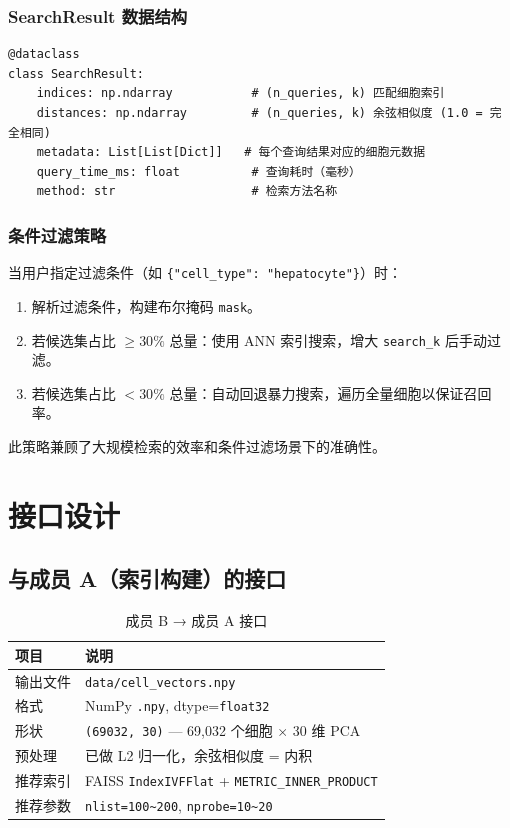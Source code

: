 \documentclass[12pt,a4paper]{ctexart}
\begin{document}
\subsubsection{SearchResult 数据结构}

\begin{lstlisting}
@dataclass
class SearchResult:
    indices: np.ndarray           # (n_queries, k) 匹配细胞索引
    distances: np.ndarray         # (n_queries, k) 余弦相似度 (1.0 = 完全相同)
    metadata: List[List[Dict]]   # 每个查询结果对应的细胞元数据
    query_time_ms: float          # 查询耗时（毫秒）
    method: str                   # 检索方法名称
\end{lstlisting}

\subsubsection{条件过滤策略}

当用户指定过滤条件（如 \texttt{\{"cell\_type": "hepatocyte"\}}）时：

\begin{enumerate}[leftmargin=*]
    \item 解析过滤条件，构建布尔掩码 \texttt{mask}。
    \item 若候选集占比 $\ge 30\%$ 总量：使用 ANN 索引搜索，增大 \texttt{search\_k} 后手动过滤。
    \item 若候选集占比 $<30\%$ 总量：自动回退暴力搜索，遍历全量细胞以保证召回率。
\end{enumerate}

此策略兼顾了大规模检索的效率和条件过滤场景下的准确性。

\section{接口设计}

\subsection{与成员 A（索引构建）的接口}

\begin{table}[H]
\centering
\caption{成员 B → 成员 A 接口}
\begin{tabular}{l|p{8cm}}
\toprule
\textbf{项目} & \textbf{说明} \\
\midrule
输出文件     & \texttt{data/cell\_vectors.npy} \\
格式         & NumPy \texttt{.npy}, dtype=\texttt{float32} \\
形状         & \texttt{(69032, 30)} — 69,032 个细胞 $\times$ 30 维 PCA \\
预处理       & 已做 L2 归一化，余弦相似度 = 内积 \\
推荐索引     & FAISS \texttt{IndexIVFFlat} + \texttt{METRIC\_INNER\_PRODUCT} \\
推荐参数     & \texttt{nlist=100\textasciitilde200}, \texttt{nprobe=10\textasciitilde20} \\
\bottomrule
\end{tabular}
\end{table}
\end{document}

